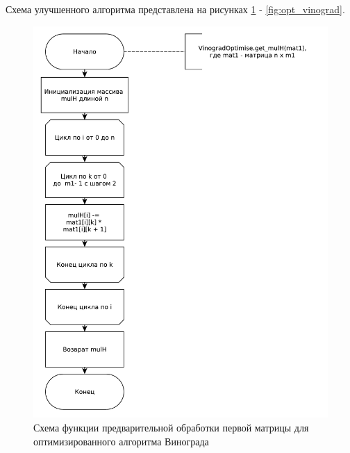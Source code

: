 \documentclass[12pt]{report}
\begin{document}
    Схема улучшенного алгоритма представлена на рисунках \ref{fig:opt_vin_mulh} - \ref{fig:opt_vinograd}.


    \begin{figure}[H]
        \centering
        \includegraphics[width=0.85\linewidth]{img/vinogradOptimise_get_mulh}
        \caption{
                Схема функции предварительной обработки первой матрицы для оптимизированного алгоритма Винограда
        }
        \label{fig:opt_vin_mulh}
    \end{figure}
\end{document}
